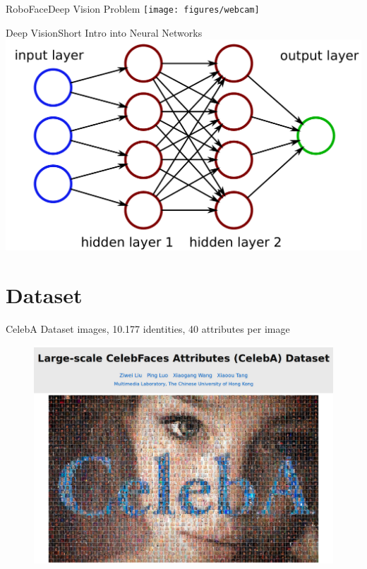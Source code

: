 \documentclass{beamer}
\begin{document}
\begin{frame}{RoboFace}{Deep Vision Problem}
		\vspace*{-11.6mm}
		\hspace*{2.85cm}
		\texttt{[image: figures/webcam]}
\end{frame}

\begin{frame}{Deep Vision}{Short Intro into Neural Networks}
	\centering
	\includegraphics[width=0.61\linewidth]{figures/hiddenLayers}
\end{frame}

\section{Dataset}
\begin{frame}{CelebA Dataset \cite{website}}
 images,
	10.177 identities,
	40 attributes per image 
	\begin{figure}
		\centering
		\includegraphics[width=0.9\linewidth]{figures/CelebA}
		\label{fig:celebA}
	\end{figure}
\end{frame}
\end{document}
